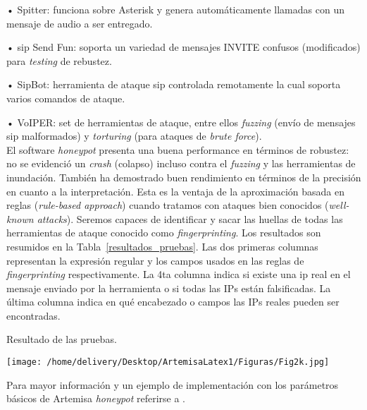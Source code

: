 \documentclass[a4paper,12pt]{report}
\begin{document}
\begin{itemize}
\begin{enumerate}
• Spitter: funciona sobre Asterisk y genera automáticamente llamadas con un
mensaje de audio a ser entregado.

• \ac{sip} Send Fun: soporta un variedad de mensajes INVITE confusos (modificados)
para \emph{testing} de rebustez. 

• SipBot: herramienta de ataque \ac{sip} controlada remotamente la cual soporta
varios comandos de ataque.

• VoIPER: set de herramientas de ataque, entre ellos \emph{fuzzing}
(envío de mensajes \ac{sip} malformados) y \emph{torturing} (para ataques de \emph{brute force}).\\

El software \emph{honeypot} presenta una buena performance en términos de robustez: no
se evidenció un \emph{crash} (colapso) incluso contra el \emph{fuzzing} y las
herramientas de i\-nun\-da\-ción. También ha demostrado buen rendimiento en términos
de la precisión en cuanto a la interpretación. Esta es la ventaja de la
aproximación basada en reglas (\emph{rule-based approach}) cuando tratamos con
ataques bien conocidos (\emph{well-known attacks}). Seremos capaces de
identificar y sacar las huellas de todas las herramientas de ataque
conocido como \emph{fingerprinting}. Los resultados son resumidos en la Tabla~\ref{resultados_pruebas}.
Las dos primeras columnas representan la expresión regular y los campos usados
en las reglas de \emph{fingerprinting} respectivamente. La 4ta columna indica
si existe una \ac{ip} real en el mensaje enviado por la herramienta o si todas las
IPs están falsificadas. La última columna indica en qué encabezado o campos las
IPs reales pueden ser encontradas.

\begin{table}
\caption{Resultado de las pruebas. \cite{docarmof}}
\centering
\texttt{[image: /home/delivery/Desktop/ArtemisaLatex1/Figuras/Fig2k.jpg]}
\label{resultados_pruebas}
\end{table}

\end{enumerate}

\end{itemize}


Para mayor información y un ejemplo de implementación con los parámetros
básicos de Artemisa \emph{honeypot} referirse a \cite{docarmom}.

\newpage
\end{document}
